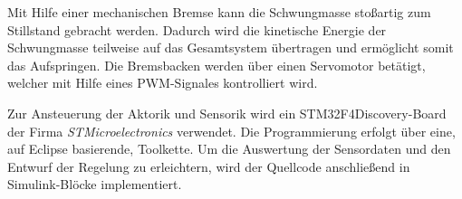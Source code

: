 Mit Hilfe einer mechanischen Bremse kann die Schwungmasse stoßartig zum Stillstand gebracht werden. Dadurch wird die kinetische Energie der Schwungmasse teilweise auf das Gesamtsystem übertragen und ermöglicht somit das Aufspringen. Die Bremsbacken werden über einen Servomotor betätigt, welcher mit Hilfe eines PWM-Signales kontrolliert wird.
\newline

Zur Ansteuerung der Aktorik und Sensorik wird ein STM32F4Discovery-Board der Firma \textit{STMicroelectronics} verwendet. Die Programmierung erfolgt über eine, auf Eclipse basierende, Toolkette. Um die Auswertung der Sensordaten und den Entwurf der Regelung zu erleichtern, wird der Quellcode anschließend in Simulink-Blöcke implementiert.
